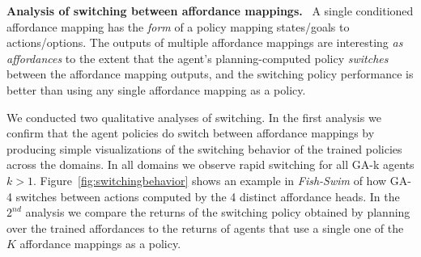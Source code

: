 \documentclass[nohyperref]{article}
\theoremstyle{plain}
\theoremstyle{definition}
\theoremstyle{remark}
\renewcommand{\paragraph}[1]{\textbf{#1}\ }
\begin{document}
\paragraph{Analysis of switching between affordance mappings.}
A single conditioned affordance mapping has the \emph{form} of a policy mapping
states/goals to actions/options. The outputs of multiple affordance mappings are interesting \emph{as affordances} to the extent that the agent's planning-computed policy \emph{switches} between the affordance mapping outputs, and the switching policy performance is better than using any single affordance mapping as a policy.  

We conducted two qualitative analyses of switching.
In the first analysis we confirm that the agent policies do switch between affordance mappings by producing simple visualizations of the switching behavior of the trained policies across the domains. In all domains we observe rapid switching for all GA-k agents $k >1$.
Figure~\ref{fig:switchingbehavior} shows an example in \emph{Fish-Swim} of how GA-4 switches between actions computed by the 4 distinct affordance heads. In the $2^{nd}$ analysis we compare the returns of the switching policy obtained by planning over the trained affordances to the returns of agents that use a single one of the $K$ affordance mappings as a policy. %

\end{document}
